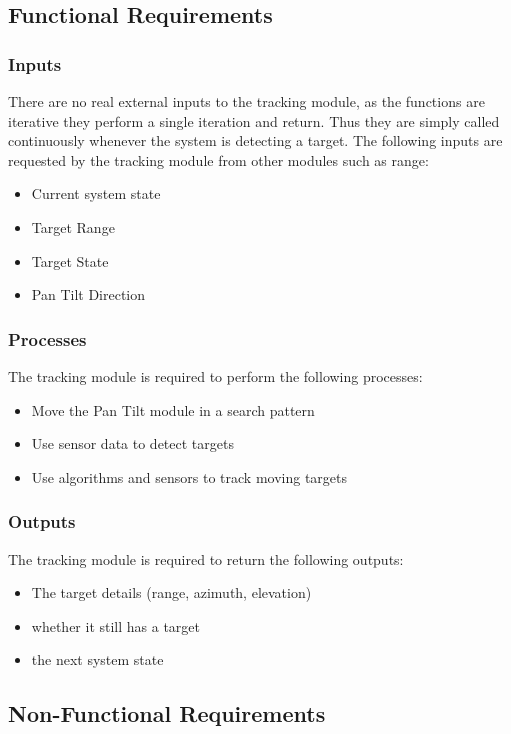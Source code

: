 \documentclass[]{report}
\begin{document}
\subsection{Functional Requirements}
\subsubsection{Inputs}
There are no real external inputs to the tracking module, as the functions are iterative they perform a single iteration and return. Thus they are simply called continuously whenever the system is detecting a target. The following inputs are requested by the tracking module from other modules such as range:
\begin{itemize}
	\item Current system state
	\item Target Range
	\item Target State
	\item Pan Tilt Direction
\end{itemize}

\subsubsection{Processes}
The tracking module is required to perform the following processes:
\begin{itemize}
	\item Move the Pan Tilt module in a search pattern
	\item Use sensor data to detect targets
	\item Use algorithms and sensors to track moving targets
\end{itemize}

\subsubsection{Outputs}
The tracking module is required to return the following outputs:
\begin{itemize}
	\item The target details (range, azimuth, elevation)
	\item whether it still has a target
	\item the next system state
\end{itemize}

\subsection{Non-Functional Requirements}
\end{document}
